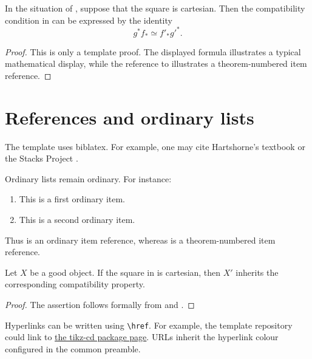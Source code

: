 \documentclass[12pt,a4paper]{amsart}
\begin{document}
\begin{lemma}
  \label{lemma:base-change}
  In the situation of , suppose that the square is
  cartesian. Then the compatibility condition in
   can be expressed by the identity
  \begin{equation}
    \label{equation:pull-back}
    g^* f_* \simeq f'_* {g'}^* .
  \end{equation}
\end{lemma}

\begin{proof}
  This is only a template proof. The displayed formula illustrates a typical
  mathematical display, while the reference to
   illustrates a theorem-numbered item reference.
\end{proof}

\section{References and ordinary lists}

The template uses biblatex. For example, one may cite
Hartshorne's textbook \cite{har77} or the Stacks Project \cite{stacks}.

Ordinary lists remain ordinary. For instance:
\begin{enumerate}[label=(\alph*), ref=(\alph*)]
  \item This is a first ordinary item.
    \label{item:ordinary-first} 
  \item This is a second ordinary item.
    \label{item:ordinary-second} 
\end{enumerate}
Thus  is an ordinary item reference, whereas
 is a theorem-numbered item reference.

\begin{proposition}
  \label{proposition:main}
  Let \(X\) be a good object. If the square in  is
  cartesian, then \(X'\) inherits the corresponding compatibility property.
\end{proposition}

\begin{proof}
  The assertion follows formally from  and
  .
\end{proof}

\begin{remark}
  \label{remark:links}
  Hyperlinks can be written using \verb|\href|. For example, the template
  repository could link to
  \href{https://www.ctan.org/pkg/tikz-cd}{the tikz-cd package page}.
  URLs inherit the hyperlink colour configured in the common preamble.
\end{remark}

\printbibliography
\end{document}
